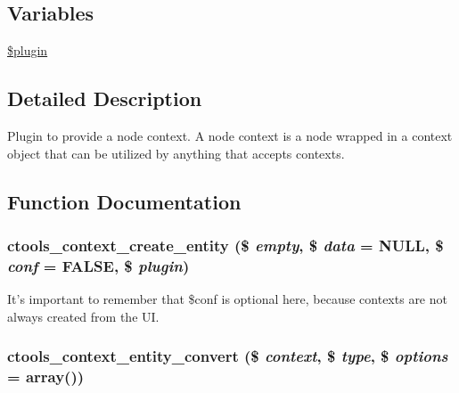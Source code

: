 \subsection*{Variables}
\begin{DoxyCompactItemize}
\item 
\hyperlink{entity_8inc_ada8a7130088351710bb02ed622d6bf65}{\$plugin}
\end{DoxyCompactItemize}


\subsection{Detailed Description}
Plugin to provide a node context. A node context is a node wrapped in a context object that can be utilized by anything that accepts contexts. 

\subsection{Function Documentation}
\hypertarget{entity_8inc_af4533bf4379c92e7c7c244654fbff6db}{
\subsubsection[{ctools\_\-context\_\-create\_\-entity}]{\setlength{\rightskip}{0pt plus 5cm}ctools\_\-context\_\-create\_\-entity (\$ {\em empty}, \/  \$ {\em data} = {\ttfamily NULL}, \/  \$ {\em conf} = {\ttfamily FALSE}, \/  \$ {\em plugin})}}
\label{entity_8inc_af4533bf4379c92e7c7c244654fbff6db}
It's important to remember that \$conf is optional here, because contexts are not always created from the UI. \hypertarget{entity_8inc_a3b833ef59dcfa7155769ee6798c9221c}{
\subsubsection[{ctools\_\-context\_\-entity\_\-convert}]{\setlength{\rightskip}{0pt plus 5cm}ctools\_\-context\_\-entity\_\-convert (\$ {\em context}, \/  \$ {\em type}, \/  \$ {\em options} = {\ttfamily array()})}}
\label{entity_8inc_a3b833ef59dcfa7155769ee6798c9221c}
